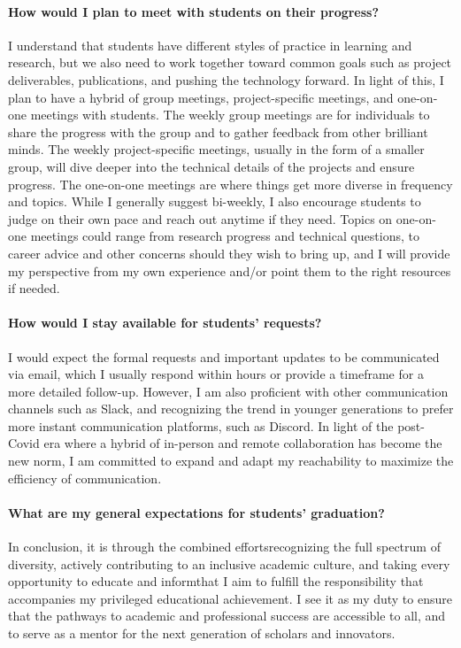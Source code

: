\paragraph{How would I plan to meet with students on their progress?}
I understand that students have different styles of practice in learning and research, but we also need to work together toward common goals such as project deliverables, publications, and pushing the technology forward. In light of this, I plan to have a hybrid of group meetings, project-specific meetings, and one-on-one meetings with students. The weekly group meetings are for individuals to share the progress with the group and to gather feedback from other brilliant minds. The weekly project-specific meetings, usually in the form of a smaller group, will dive deeper into the technical details of the projects and ensure progress. The one-on-one meetings are where things get more diverse in frequency and topics. While I generally suggest bi-weekly, I also encourage students to judge on their own pace and reach out anytime if they need. Topics on one-on-one meetings could range from research progress and technical questions, to career advice and other concerns should they wish to bring up, and I will provide my perspective from my own experience and/or point them to the right resources if needed.

\paragraph{How would I stay available for students' requests?}
I would expect the formal requests and important updates to be communicated via email, which I usually respond within hours or provide a timeframe for a more detailed follow-up. However, I am also proficient with other communication channels such as Slack, and recognizing the trend in younger generations to prefer more instant communication platforms, such as Discord. In light of the post-Covid era where a hybrid of in-person and remote collaboration has become the new norm, I am committed to expand and adapt my reachability to maximize the efficiency of communication.

\paragraph{What are my general expectations for students' graduation?}




In conclusion, it is through the combined efforts\textemdash recognizing the full spectrum of diversity, actively contributing to an inclusive academic culture, and taking every opportunity to educate and inform\textemdash that I aim to fulfill the responsibility that accompanies my privileged educational achievement. I see it as my duty to ensure that the pathways to academic and professional success are accessible to all, and to serve as a mentor for the next generation of scholars and innovators.


